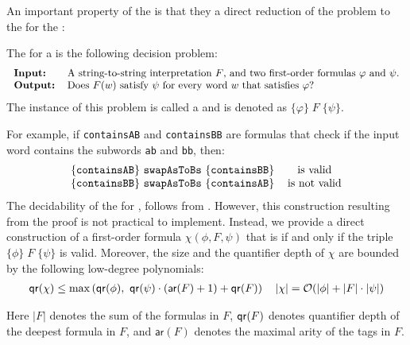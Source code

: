 An important property of the  is that they a direct
reduction of the  problem to the  for the :
\begin{definition}
    The  for a  is the following decision problem: 
    \[
        \begin{tabular}{ll}
        \textbf{Input:} & A string-to-string interpretation $F$, and two first-order formulas $\varphi$ and $\psi$.\\
        \textbf{Output:} & Does $F(w)$ satisfy $\psi$ for every word $w$ that satisfies $\varphi$?
        \end{tabular}
    \]
    The instance of this problem is called a  and is denoted as $\{ \varphi \}\; F\; \{ \psi \}$. 
\end{definition}
For example, if \texttt{containsAB} and \texttt{containsBB} are formulas that check if the input word contains the
subwords \texttt{ab} and \texttt{bb}, then:
\[
\begin{tabular}{ccc}
$\{ \mathtt{containsAB} \}\ \texttt{swapAsToBs}\ \{ \mathtt{containsBB} \}$ & is  valid\\
$\{ \mathtt{containsBB} \}\ \mathtt{swapAsToBs}\ \{ \mathtt{containsAB} \}$ & is not  valid
\end{tabular}
\]
The decidability of the  for ,
follows from \cite[Theorem~1.7]{bojanczyk2018polyregular}. However, this construction resulting from the proof is not practical to implement.
Instead, we provide a direct construction of a first-order formula $\chi(\phi, F, \psi)$
that is  if and only if the triple $\{ \phi \}\; F\; \{ \psi \}$ is valid.
Moreover, the size and the quantifier depth of $\chi$ are bounded by the following low-degree polynomials:
\begin{align*}
    \mathop{\mathsf{qr}}(\chi) \leq \max\left(\mathop{\mathsf{qr}}(\phi),\ \mathop{\mathsf{qr}}(\psi) \cdot \left(\textsf{ar}(F) + 1\right)  + \mathop{\mathsf{qr}}(F)\right) \quad |\chi| = \mathcal{O} (|\phi| + |F| \cdot |\psi|)
\end{align*}

Here $|F|$ denotes the sum of the formulas in $F$,
$\mathop{\mathsf{qr}}(F)$ denotes quantifier depth of the deepest formula in $F$, 
and $\textsf{ar}(F)$ denotes the maximal arity of the tags in $F$.


